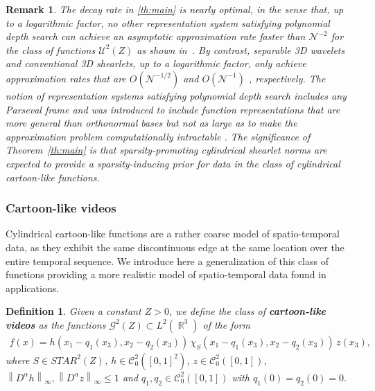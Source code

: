 \documentclass[11pt,a4paper]{article}
\numberwithin{equation}{section}
\newtheorem{definition}[theorem]{Definition}
\newtheorem{remark}{Remark}[section]
\DeclareMathOperator{\R}{\mathbb{R}}
\newcommand{\norm}[1]{\left\lVert#1\right\rVert}
\newcommand{\videos}{\mathcal{G}^2(Z)} %
\begin{document}
\begin{remark}
The decay rate in \cref{th:main} is nearly optimal, in the sense that, up to a logarithmic factor, no other representation system satisfying polynomial depth search can achieve an asymptotic approximation rate faster than $\mathscr{N}^{-2}$ for the class of functions $\mathcal{U}^2(Z)$ as shown in~\cite{Easley21}. By contrast, separable 3D wavelets and conventional 3D shearlets, up to a logarithmic factor, only achieve approximation rates that are $O(\mathscr{N}^{-1/2})$ \cite{devore1998} and $O(\mathscr{N}^{-1})$ \cite{GL_3D}, respectively. The notion of representation systems {\it satisfying polynomial depth search} includes any Parseval frame and was introduced to include function representations that are more general than orthonormal bases but not as large as to make the approximation problem computationally intractable \cite{candes1999,GL_3D}. The significance of Theorem~\ref{th:main} is that sparsity-promoting \emph{cylindrical shearlet norms are expected to provide a sparsity-inducing prior for data in the class of cylindrical cartoon-like functions}. 
\end{remark}

\subsubsection{Cartoon-like videos} \label{ssec:cartoon-videos}
Cylindrical cartoon-like functions are a rather coarse model of spatio-temporal data, as they exhibit the same discontinuous edge at the same location over the entire temporal sequence. We introduce here a generalization of this class of functions providing a more realistic model of spatio-temporal data found in applications.

\begin{definition}  \label{def.videos}
Given a constant $Z > 0$, we define the class of {\bf cartoon-like videos} as the functions $\videos \subset L^2(\R^3)$ of the form
\begin{eqnarray}\label{slant.funct}
    f(x) = h(x_1 - q_1(x_3), x_2 - q_2(x_3)) \, \chi_{S}(x_1 - q_1(x_3), x_2 - q_2(x_3)) \, z(x_3),
\end{eqnarray}
 where $S \in STAR^2(Z)$, $h \in  \mathcal{C}_0^2 ([0, 1]^2 )$, $z \in \mathcal{C}_0^2 ([0, 1])$, 
$\norm{D^{\alpha} h}_{\infty}, \norm{D^{\alpha} z}_{\infty}\leq 1$  and  $q_1, q_2 \in \mathcal{C}_0^2 ([0, 1])$ with $q_1(0)=q_2(0)=0.$   
\end{definition}
\end{document}
